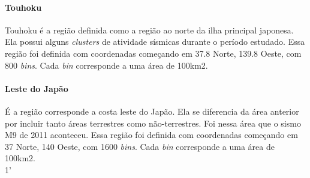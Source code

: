 \paragraph{Touhoku} Touhoku é a região definida como a região ao norte da ilha principal japonesa. Ela possui alguns {\it clusters} de atividade sísmicas durante o período estudado. Essa região foi definida com coordenadas começando em 37.8 Norte, 139.8 Oeste, com  800 {\it bins}. Cada {\it bin} corresponde a uma área de 100km2. \\

\paragraph{Leste do Japão} É a região corresponde a costa leste do Japão. Ela se diferencia da área anterior por incluir tanto áreas terrestres como não-terrestres. Foi nessa área que o sismo M9 de 2011 aconteceu. Essa região foi definida com coordenadas começando em 37 Norte, 140 Oeste, com  1600 {\it bins}. Cada {\it bin} corresponde a uma área de 100km2. \\

%




1'